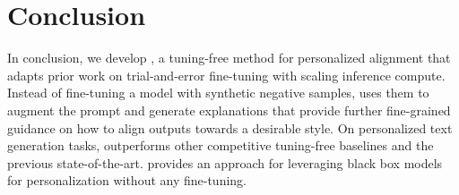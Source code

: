 \section{Conclusion}

In conclusion, we develop \ours, a tuning-free method for personalized alignment that adapts prior work on trial-and-error fine-tuning with scaling inference compute.   
Instead of fine-tuning a model with synthetic negative samples, \ours uses them to augment the prompt and generate explanations that provide further fine-grained guidance on how to align outputs towards a desirable style.
On personalized text generation tasks, \ours outperforms other competitive tuning-free baselines and the previous state-of-the-art.  
\ours provides an approach for leveraging black box models for personalization without any fine-tuning. 
